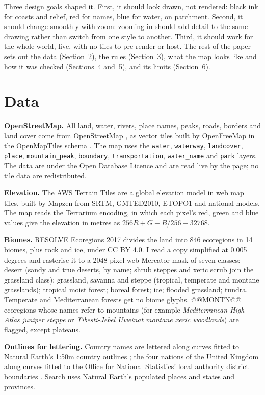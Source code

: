 \documentclass[11pt,a4paper]{article}
\begin{document}
Three design goals shaped it. First, it should look drawn, not rendered: black ink for coasts and relief, red for names, blue for water, on parchment. Second, it should change smoothly with zoom: zooming in should add detail to the same drawing rather than switch from one style to another. Third, it should work for the whole world, live, with no tiles to pre-render or host. The rest of the paper sets out the data (Section~2), the rules (Section~3), what the map looks like and how it was checked (Sections~4 and~5), and its limits (Section~6).

\section{Data}
\textbf{OpenStreetMap.} All land, water, rivers, place names, peaks, roads, borders and land cover come from OpenStreetMap \citep{osm}, as vector tiles built by OpenFreeMap \citep{openfreemap} in the OpenMapTiles schema \citep{openmaptiles}. The map uses the \texttt{water}, \texttt{waterway}, \texttt{landcover}, \texttt{place}, \texttt{mountain\_peak}, \texttt{boundary}, \texttt{transportation}, \texttt{water\_name} and \texttt{park} layers. The data are under the Open Database Licence and are read live by the page; no tile data are redistributed.

\textbf{Elevation.} The AWS Terrain Tiles \citep{terrain} are a global elevation model in web map tiles, built by Mapzen from SRTM, GMTED2010, ETOPO1 and national models. The map reads the Terrarium encoding, in which each pixel's red, green and blue values give the elevation in metres as $256R + G + B/256 - 32768$.

\textbf{Biomes.} RESOLVE Ecoregions 2017 \citep{resolve} divides the land into 846 ecoregions in 14 biomes, plus rock and ice, under CC BY 4.0. I read a copy simplified at 0.005 degrees and rasterise it to a 2048 pixel web Mercator mask of seven classes: desert (sandy and true deserts, by name; shrub steppes and xeric scrub join the grassland class); grassland, savanna and steppe (tropical, temperate and montane grasslands); tropical moist forest; boreal forest; ice; flooded grassland; tundra. Temperate and Mediterranean forests get no biome glyphs. @@MONTN@@ ecoregions whose names refer to mountains (for example \emph{Mediterranean High Atlas juniper steppe} or \emph{Tibesti-Jebel Uweinat montane xeric woodlands}) are flagged, except plateaus.

\textbf{Outlines for lettering.} Country names are lettered along curves fitted to Natural Earth's 1:50m country outlines \citep{naturalearth}; the four nations of the United Kingdom along curves fitted to the Office for National Statistics' local authority district boundaries \citep{ons}. Search uses Natural Earth's populated places and states and provinces.
\end{document}
